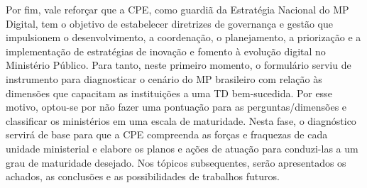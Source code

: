 Por fim, vale reforçar que a CPE, como guardiã da Estratégia Nacional do MP Digital, tem o objetivo de estabelecer diretrizes de governança e gestão que impulsionem o desenvolvimento, a coordenação, o planejamento, a priorização e a implementação de estratégias de inovação e fomento à evolução digital no Ministério Público. Para tanto, neste primeiro momento, o formulário serviu de instrumento para diagnosticar o cenário do MP brasileiro com relação às dimensões que capacitam as instituições a uma TD bem-sucedida. Por esse motivo, optou-se por não fazer uma pontuação para as perguntas/dimensões e classificar os ministérios em uma escala de maturidade. Nesta fase, o diagnóstico servirá de base para que a CPE compreenda as forças e fraquezas de cada unidade ministerial e elabore os planos e ações de atuação para conduzi-las a um grau de maturidade desejado. Nos tópicos subsequentes, serão apresentados os achados, as conclusões e as possibilidades de trabalhos futuros.
